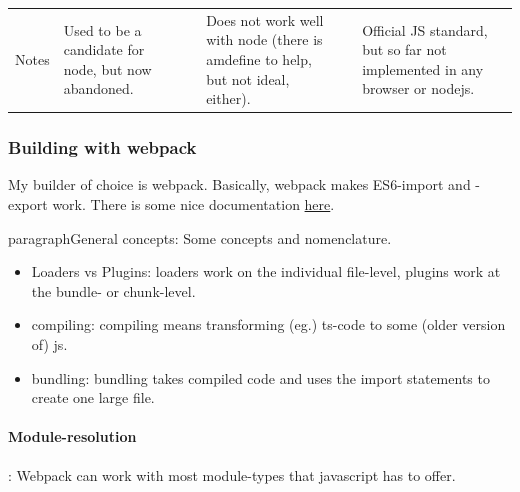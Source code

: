 \begin{table}[ht]
\begin{tabularx}{1.2\textwidth}{XXXXXX}
        Notes           & Used to be a candidate for node, but now abandoned.                 &                                                                          & Does not work well with node (there is amdefine to help, but not ideal, either). &                                                               & Official JS standard, but so far not implemented in any browser or nodejs.
    \end{tabularx}
\end{table}

    

\subsubsection{Building with webpack}
My builder of choice is webpack. Basically, webpack makes ES6-import and -export work. There is some nice documentation \href{https://what-problem-does-it-solve.com/webpack/index.html}{here}.

paragraph{General concepts}: Some concepts and nomenclature.

\begin{itemize}
    \item Loaders vs Plugins: loaders work on the individual file-level, plugins work at the bundle- or chunk-level.
    \item compiling: compiling means transforming (eg.) ts-code to some (older version of) js.
    \item bundling: bundling takes compiled code and uses the import statements to create one large file.
\end{itemize}

\paragraph{Module-resolution}: Webpack can work with most module-types that javascript has to offer.

